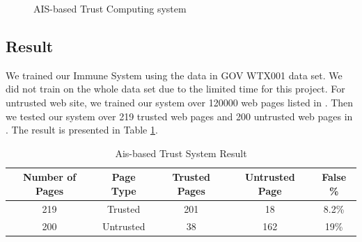\documentclass{llncs}
\begin{document}
\begin{figure}[h]
\begin{center}
\caption{AIS-based Trust Computing system}
\label{fig:arch}
\end{center}
\vspace{-20pt}
\end{figure}

\subsection{Result}
We trained our Immune System using the data in GOV WTX001 data set\cite{WTX}. We did not train on the whole data set due to the limited time for this project. For untrusted web site, we trained our system over 120000 web pages listed in \cite{WEBSPAM-UK2007}. Then we tested our system over 219 trusted web pages and 200 untrusted web pages in \cite{WEBSPAM-UK2007}. The result is presented in Table \ref{table:result}.
\begin{table}[t]
\renewcommand{\arraystretch}{1.3}
\caption{\small Ais-based Trust System Result}
\label{table:result}
\centering
{\scriptsize
\begin{tabular}{ccccc}
\hline
Number of Pages & Page Type & Trusted Pages & Untrusted Page & False \%\\
\hline
219 & Trusted & 201 & 18 & 8.2\%\\
200 & Untrusted & 38 & 162 & 19\%\\
\hline
\end{tabular}
}
\end{table}
\end{document}
